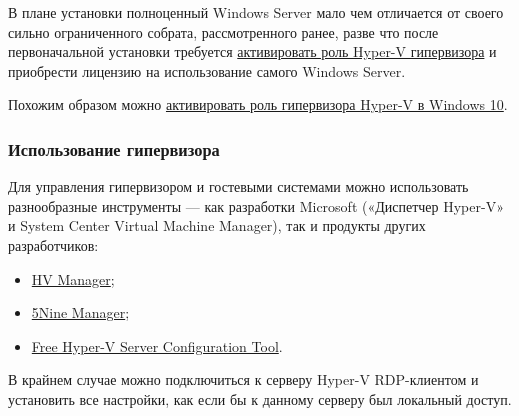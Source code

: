 \documentclass[14pt, a4paper]{article}
\begin{document}
В плане установки полноценный Windows Server мало чем отличается от своего сильно ограниченного
собрата, рассмотренного ранее, разве что после первоначальной установки требуется \href{https://docs.microsoft.com/ru-ru/windows-server/virtualization/hyper-v/get-started/install-the-hyper-v-role-on-windows-server}{активировать
роль Hyper-V гипервизора} и приобрести лицензию на использование самого Windows Server.

Похожим образом можно \href{https://docs.microsoft.com/ru-ru/virtualization/hyper-v-on-windows/quick-start/enable-hyper-v}{активировать роль гипервизора Hyper-V в Windows 10}.\\


\subsubsection*{Использование гипервизора}

Для управления гипервизором и гостевыми системами можно использовать разнообразные
инструменты — как разработки Microsoft («Диспетчер Hyper-V» и System Center Virtual Machine
Manager), так и продукты других разработчиков:

\begin{itemize}
    \item \href{http://hv-manager.org/}{HV Manager};
    \item \href{https://www.5nine.com/5nine-manager-standard-edition/}{5Nine Manager};
    \item \href{https://www.manageengine.com/free-hyper-v-configuration/free-hyper-v-configuration-index.html}{Free Hyper-V Server Configuration Tool}.
\end{itemize}

В крайнем случае можно подключиться к серверу Hyper-V RDP-клиентом и установить все настройки,
как если бы к данному серверу был локальный доступ.

\begin{figure}[h]%
    \centering
    \\
    \label{1.3} %
\end{figure}
\end{document}
